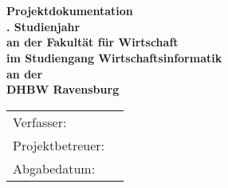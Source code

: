 \begin{titlepage}
	\begin{center}
		\vspace*{1cm}
		\LARGE\bf\myTopic\\
		\Large\rm\mySubTopic\\
		\vspace*{2cm}
		\bf Projektdokumentation\\
		\vspace*{0.5cm}\singlespacing
		\normalsize\rm
		\myPraxPhase. Studienjahr \\
		\vspace*{0.5cm}\singlespacing
		an der Fakultät für Wirtschaft\\
		im Studiengang Wirtschaftsinformatik\\
		\vspace*{0.5cm}\singlespacing
		an der\\
		DHBW Ravensburg
		\vfill
	\end{center}
	\begin{tabular}{ll}
		Verfasser:&\myAutor\\
		Projektbetreuer:&\myProf\\
		Abgabedatum:&\myEndDate\\
	\end{tabular}
	
\end{titlepage}
\newpage
\setcounter{page}{2}
